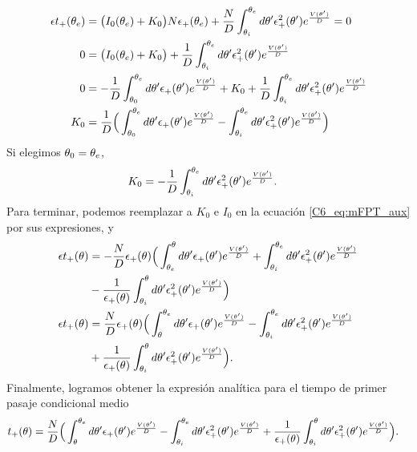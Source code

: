\documentclass[./main.tex]{subfiles}
\begin{document}
\begin{align}
   \epsilon t_+(\theta_e) &= \big(I_0(\theta_e)+K_0\big) N \epsilon_{+}(\theta_e) + \frac{N}{D} \int_{\theta_i}^{\theta_e} d\theta'  \epsilon_{+}^2(\theta') e^{ \frac{V(\theta')}{D}} = 0 \nonumber \\
   0&=\big(I_0(\theta_e)+K_0\big) + \frac{1}{D} \int_{\theta_i}^{\theta_e} d\theta'  \epsilon_{+}^2(\theta') e^{ \frac{V(\theta')}{D}} \nonumber \\
   0&=-\frac{1}{D} \int_{\theta_0}^{\theta_e} d \theta' \epsilon_{+}(\theta') e^{ \frac{V(\theta')}{D}} +K_0 + \frac{1}{D} \int_{\theta_i}^{\theta_e} d\theta'  \epsilon_{+}^2(\theta') e^{ \frac{V(\theta')}{D}} \nonumber \\
   K_0 &= \frac{1}{D} \Big( \int_{\theta_0}^{\theta_e} d \theta' \epsilon_{+}(\theta') e^{ \frac{V(\theta')}{D}} - \int_{\theta_i}^{\theta_e} d\theta'  \epsilon_{+}^2(\theta') e^{ \frac{V(\theta')}{D}}\Big)
\end{align}
Si elegimos $\theta_0 = \theta_e$,
\begin{align}
   K_0 &= -\frac{1}{D} \int_{\theta_i}^{\theta_e} d\theta'  \epsilon_{+}^2(\theta') e^{ \frac{V(\theta')}{D}}.
\end{align}
Para terminar, podemos reemplazar a $K_0$ e $I_0$ en la ecuación \ref{C6_eq:mFPT_aux} por sus expresiones, y
\begin{align}
   \epsilon t_+(\theta) &= - \frac{N}{D} \epsilon_{+}(\theta) \Big(  \int_{\theta_e}^\theta d \theta' \epsilon_{+}(\theta') e^{ \frac{V(\theta')}{D}} +  \int_{\theta_i}^{\theta_e} d\theta'  \epsilon_{+}^2(\theta') e^{ \frac{V(\theta')}{D}} \nonumber \\ & - \frac{1}{\epsilon_{+}(\theta)} \int_{\theta_i}^{\theta} d\theta'  \epsilon_{+}^2(\theta') e^{ \frac{V(\theta')}{D}} \Big) \nonumber \\
     \epsilon t_+(\theta) &= \frac{N}{D} \epsilon_{+}(\theta) \Big(  \int_\theta^{\theta_e} d \theta' \epsilon_{+}(\theta') e^{ \frac{V(\theta')}{D}} -  \int_{\theta_i}^{\theta_e} d\theta'  \epsilon_{+}^2(\theta') e^{ \frac{V(\theta')}{D}} \nonumber \\ & + \frac{1}{\epsilon_{+}(\theta)} \int_{\theta_i}^{\theta} d\theta'  \epsilon_{+}^2(\theta') e^{ \frac{V(\theta')}{D}} \Big).
\end{align}
Finalmente, logramos obtener la expresión analítica para el tiempo de primer pasaje condicional medio
\begin{align}
     t_{+}(\theta)&= \frac{N}{D} \Big(  \int_\theta^{\theta_e} d \theta' \epsilon_{+}(\theta') e^{ \frac{V(\theta')}{D}} -  \int_{\theta_i}^{\theta_e} d\theta'  \epsilon_{+}^2(\theta') e^{ \frac{V(\theta')}{D}} + \frac{1}{\epsilon_{+}(\theta)} \int_{\theta_i}^{\theta} d\theta'  \epsilon_{+}^2(\theta') e^{ \frac{V(\theta')}{D}} \Big). \label{C6_eq:mFPT_tplus_res}
\end{align}
\end{document}
